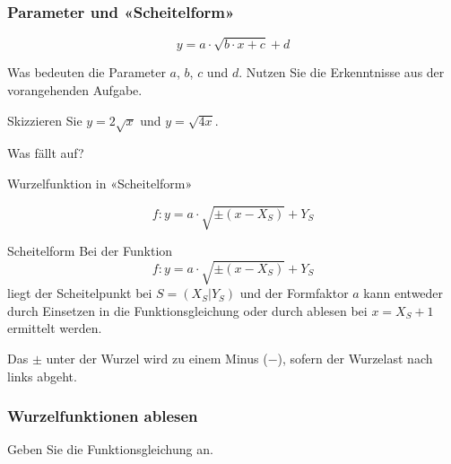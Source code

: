 \newpage


\subsubsection{Parameter und «Scheitelform»}
$$y = a\cdot{} \sqrt{b\cdot{}x + c} + d$$

Was bedeuten die Parameter $a$, $b$, $c$ und $d$. Nutzen Sie die
Erkenntnisse aus der vorangehenden Aufgabe.


Skizzieren Sie $y=2\sqrt{x}$ und $y=\sqrt{4x}$.

Was fällt auf?



\begin{definition}{Wurzelfunktion in «Scheitelform»}{}

  $$f: y = a\cdot{}\sqrt{\pm(x-X_S)} + Y_S$$

\end{definition}

\begin{gesetz}{Scheitelform}{}
  Bei der Funktion
  $$f: y = a\cdot{}\sqrt{\pm(x-X_S)} + Y_S$$
liegt der Scheitelpunkt bei $S=(X_S | Y_S)$ und der Formfaktor $a$ kann
entweder durch Einsetzen in die Funktionsgleichung oder durch ablesen
bei $x=X_S+1$ ermittelt werden.

Das $\pm$ unter der Wurzel wird zu einem Minus ($-$), sofern der
Wurzelast nach links abgeht.
\end{gesetz}

\newpage
\subsubsection{Wurzelfunktionen ablesen}

Geben Sie die Funktionsgleichung an.

